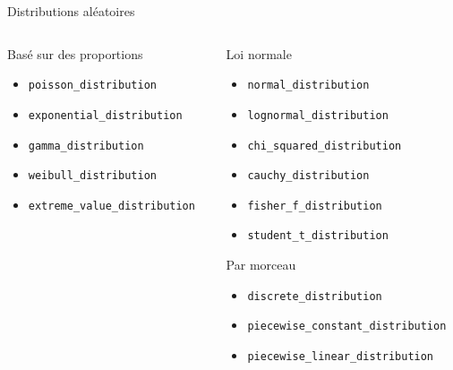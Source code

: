 \documentclass[handout,10pt]{beamer}
\begin{document}
\begin{frame}[fragile]{Distributions aléatoires}
\begin{columns}
\begin{column}{0.5\textwidth}
 \begin{block}{Basé sur des proportions}
   \begin{itemize}
     \item \lstinline$poisson_distribution$
     \item \lstinline$exponential_distribution$
     \item \lstinline$gamma_distribution$
     \item \lstinline$weibull_distribution$
     \item \lstinline$extreme_value_distribution$
   \end{itemize}
 \end{block}
 \end{column}
 \begin{column}{0.5\textwidth}
 \begin{block}{Loi normale}
    \begin{itemize}
     \item \lstinline$normal_distribution$
     \item \lstinline$lognormal_distribution$
     \item \lstinline$chi_squared_distribution$
     \item \lstinline$cauchy_distribution$
     \item \lstinline$fisher_f_distribution$
     \item \lstinline$student_t_distribution$
    \end{itemize}
 \end{block}
 \begin{block}{Par morceau}
  \begin{itemize}
   \item \lstinline$discrete_distribution$
   \item \lstinline$piecewise_constant_distribution$
   \item \lstinline$piecewise_linear_distribution$
  \end{itemize}
 \end{block}
 \end{column}
\end{columns}
\end{frame}
\end{document}
